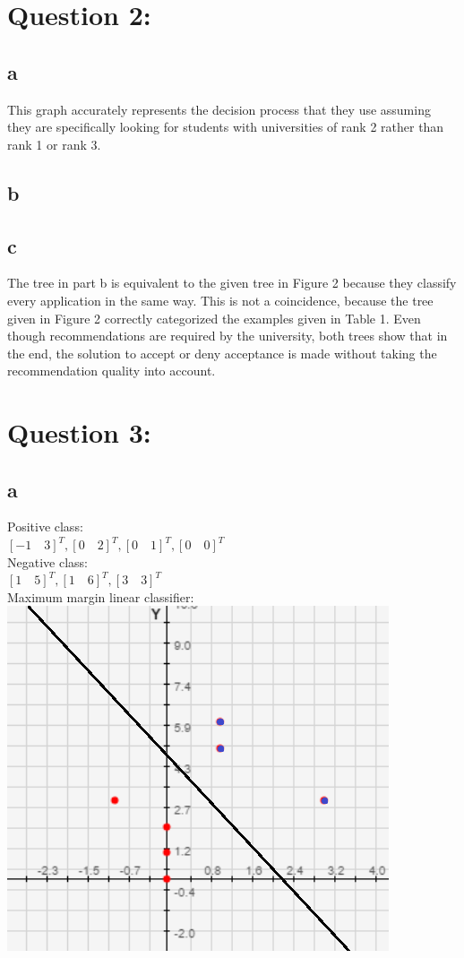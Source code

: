 \documentclass[11pt, oneside]{article}   	%
\begin{document}
\begin{flushleft}
\section*{Question 2:}
\subsection*{a}
This graph accurately represents the decision process that they use assuming they are specifically looking for students with universities of rank 2 rather than rank 1 or rank 3.
\subsection*{b}

\subsection*{c}
The tree in part b is equivalent to the given tree in Figure 2 because they classify every application in the same way. This is not a coincidence, because the tree given in Figure 2 correctly categorized the examples given in Table 1. Even though recommendations are required by the university, both trees show that in the end, the solution to accept or deny acceptance is made without taking the recommendation quality into account.\\
\section*{Question 3:}
\subsection*{a}
Positive class: \\
$[-1\quad3]^T ,[0\quad2]^T ,[0\quad1]^T ,[0\quad0]^T $\\
Negative class: \\
$[1\quad5]^T ,[1\quad6]^T ,[3\quad3]^T $\\
Maximum margin linear classifier:\\
\includegraphics[]{q3_1.png}

\end{flushleft}
\end{document}
